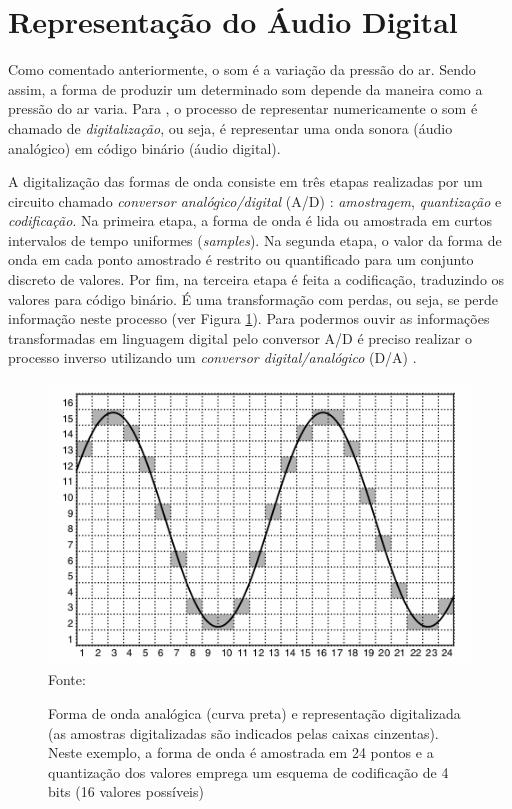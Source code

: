 \section{Representação do Áudio Digital} \label{sec:formatos}

Como comentado anteriormente, o som é a variação da pressão do ar. Sendo assim, a forma de produzir um determinado som depende da maneira como a pressão do ar varia. Para , o processo de representar numericamente o som é chamado de \textit{digitalização}, ou seja, é representar uma onda sonora (áudio analógico) em código binário (áudio digital). 

A digitalização das formas de onda consiste em três etapas realizadas por um circuito chamado \textit{conversor analógico/digital} (A/D) \cite{paulozuben2004}: \textit{amostragem}, \textit{quantização} e \textit{codificação}. Na primeira etapa, a forma de onda é lida ou amostrada em curtos intervalos de tempo uniformes (\textit{samples}). Na segunda etapa, o valor da forma de onda em cada ponto amostrado é restrito ou quantificado para um conjunto discreto de valores. Por fim, na terceira etapa é feita a codificação, traduzindo os valores para código binário. É uma transformação com perdas, ou seja, se perde informação neste processo (ver Figura \ref{fig:ondaAnalog}). Para podermos ouvir as informações transformadas em linguagem digital pelo conversor A/D é preciso realizar o processo inverso utilizando um \textit{conversor digital/analógico} (D/A) \cite{paulozuben2004}.

\begin{figure}[!htb]
   \centering
   \caption{Forma de onda analógica (curva preta) e representação digitalizada (as amostras digitalizadas são indicados pelas caixas cinzentas). Neste exemplo, a forma de onda é amostrada em 24 pontos e a quantização dos valores emprega um esquema de codificação de 4 bits (16 valores possíveis)}\label{fig:ondaAnalog} 
   \includegraphics[scale=0.8]{figuras/ondaAnalog.png}
   \\Fonte: \cite{muller2007}
\end{figure}

